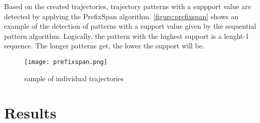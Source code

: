 Based on the created trajectories, trajectory patterns with a suppport value are detected by applying the PrefixSpan algorithm. \autoref{figure:prefixspan} shows an example of the detection of patterns with a support value given by the sequential pattern algorithm. Logically, the pattern with the highest support is a lenght-1 sequence. The longer patterns get, the lower the support will be.  

\begin{figure}[H]
\centering
\texttt{[image: prefixspan.png]}
\captionsetup{justification=centering}
\caption{sample of individual trajectories}
\label{figure:prefixspan}
\end{figure}


 
\section{Results}





